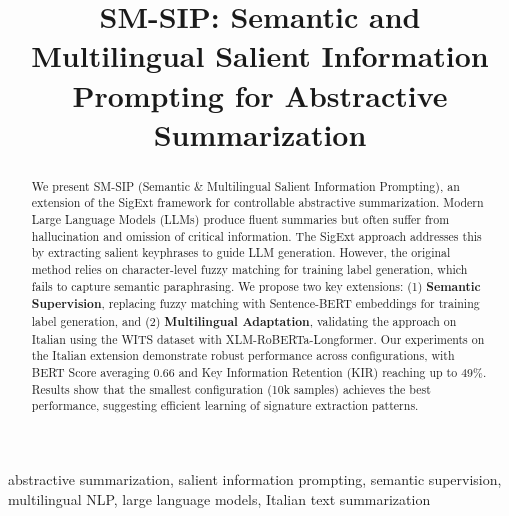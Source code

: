 \documentclass[conference]{IEEEtran}
\begin{document}
\title{SM-SIP: Semantic and Multilingual Salient Information Prompting for Abstractive Summarization}

\author{
\and
{}
\and
{}
}

\maketitle

\begin{abstract}
We present SM-SIP (Semantic \& Multilingual Salient Information Prompting), an extension of the SigExt framework for controllable abstractive summarization. Modern Large Language Models (LLMs) produce fluent summaries but often suffer from hallucination and omission of critical information. The SigExt approach addresses this by extracting salient keyphrases to guide LLM generation. However, the original method relies on character-level fuzzy matching for training label generation, which fails to capture semantic paraphrasing. We propose two key extensions: (1) \textbf{Semantic Supervision}, replacing fuzzy matching with Sentence-BERT embeddings for training label generation, and (2) \textbf{Multilingual Adaptation}, validating the approach on Italian using the WITS dataset with XLM-RoBERTa-Longformer. Our experiments on the Italian extension demonstrate robust performance across configurations, with BERT Score averaging 0.66 and Key Information Retention (KIR) reaching up to 49\%. Results show that the smallest configuration (10k samples) achieves the best performance, suggesting efficient learning of signature extraction patterns.
\end{abstract}

\begin{IEEEkeywords}
abstractive summarization, salient information prompting, semantic supervision, multilingual NLP, large language models, Italian text summarization
\end{IEEEkeywords}
\end{document}
